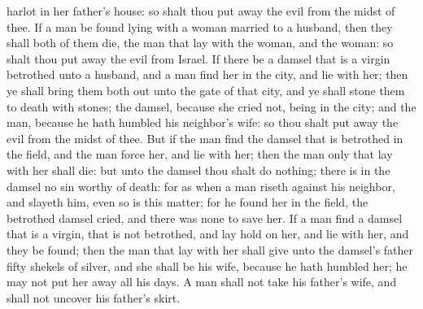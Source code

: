 harlot in her father’s house: so shalt thou put away the evil from the midst of thee.  If a man be found lying with a woman married to a husband, then they shall both of them die, the man that lay with the woman, and the woman: so shalt thou put away the evil from Israel.  If there be a damsel that is a virgin betrothed unto a husband, and a man find her in the city, and lie with her; then ye shall bring them both out unto the gate of that city, and ye shall stone them to death with stones; the damsel, because she cried not, being in the city; and the man, because he hath humbled his neighbor’s wife: so thou shalt put away the evil from the midst of thee.  But if the man find the damsel that is betrothed in the field, and the man force her, and lie with her; then the man only that lay with her shall die: but unto the damsel thou shalt do nothing; there is in the damsel no sin worthy of death: for as when a man riseth against his neighbor, and slayeth him, even so is this matter; for he found her in the field, the betrothed damsel cried, and there was none to save her.  If a man find a damsel that is a virgin, that is not betrothed, and lay hold on her, and lie with her, and they be found; then the man that lay with her shall give unto the damsel’s father fifty shekels of silver, and she shall be his wife, because he hath humbled her; he may not put her away all his days.  A man shall not take his father’s wife, and shall not uncover his father’s skirt. 

